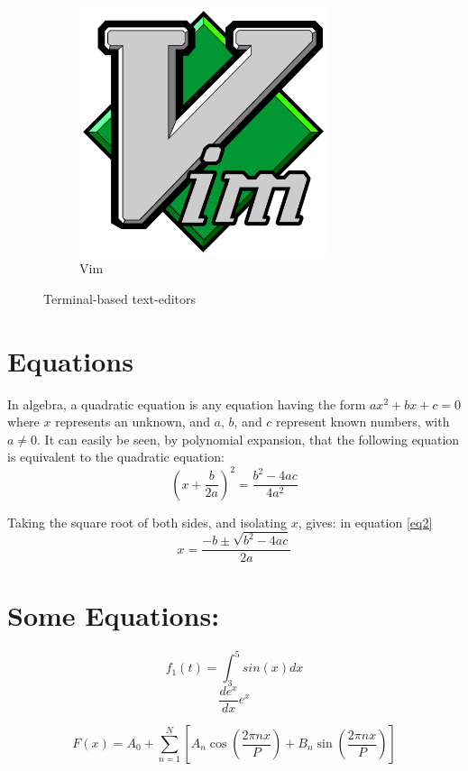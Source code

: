 \documentclass[14pt]{article}
\begin{document}
\begin{figure}[h]
\begin{subfigure}{0.3\textwidth}
			\includegraphics[width=0.8\textwidth]{vimlogo.png}
			\caption{Vim}
		\end{subfigure}
	\caption{Terminal-based text-editors}
	\end{figure}

	\section{Equations}
	In algebra, a quadratic equation is any equation having the form $ax^2+bx+c=0$ where $x$ represents an unknown, and $a$, $b$, and $c$ represent known numbers, with
	$a\neq0$. It can easily be seen, by polynomial expansion, that the following
	equation is equivalent to the quadratic equation:
	$${\left(x+\frac{b}{2a}\right)}^2=\frac{b^2-4ac}{4a^2}$$
	
	Taking the square root of both sides, and isolating $x$, gives: in equation \ref{eq2}
	\begin{equation}
		x = \frac{-b\pm\sqrt{b^2-4ac}}{2a}
	\end{equation}
	
	\section*{Some Equations:}
	$$f_1(t) = \int_{3}^{5}sin(x)dx$$
	$$\frac{de^x}{dx}e^x$$
	
	
	
	
	$$F(x) = A_0 + \sum_{n=1}^{N}\left[A_n\cos\left(\frac{2\pi nx}{P}\right)+B_n\sin\left(\frac{2\pi nx}{P}\right)\right]$$
	
\end{document}
